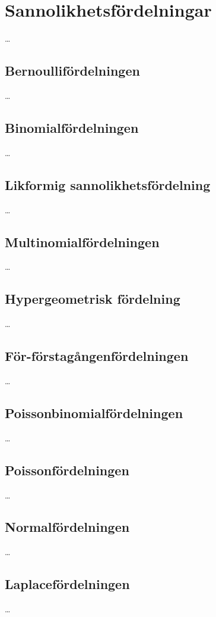 %
%
%

\chapter{Sannolikhetsfördelningar}
\label{Sannolikhetsfordelningar}

\dots


\section{Bernoullifördelningen}

\dots


\section{Binomialfördelningen}

\dots


\section{Likformig sannolikhetsfördelning}

\dots


\section{Multinomialfördelningen}

\dots


\section{Hypergeometrisk fördelning}

\dots


\section{För-förstagångenfördelningen}

\dots


\section{Poissonbinomialfördelningen}

\dots


\section{Poissonfördelningen}

\dots


\section{Normalfördelningen}

\dots


\section{Laplacefördelningen}

\dots
